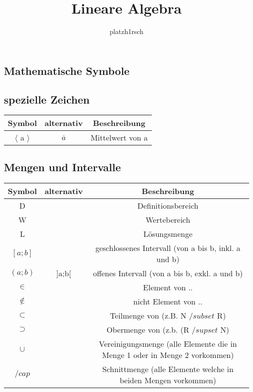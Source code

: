 \documentclass[11pt,a4paper,onecolumn]{scrartcl}
\author{platzh1rsch}
\title{Lineare Algebra}
\begin{document}
\maketitle
\newpage
\begin{flushleft}

\section{Mathematische Symbole}
\subsection{spezielle Zeichen}

\begin{tabular}{|c|c|c|}
\hline 
Symbol & alternativ & Beschreibung \\ 
\hline 
$ \langle $ a $ \rangle $ & $ \overline{a} $ & Mittelwert von a \\ 
\hline 
\end{tabular} 

\subsection{Mengen und Intervalle}

\begin{tabular}{|c|c|c|}
\hline 
Symbol & alternativ & Beschreibung \\ 
\hline 
D  &  & Definitionsbereich \\ 
W  &  & Wertebereich \\ 
L  &  & Lösungsmenge \\ 
\hline
$ [a;b] $ &  & geschlossenes Intervall (von a bis b, inkl. a und b)\\ 
$(a;b)$  & ]a;b[ & offenes Intervall (von a bis b, exkl. a und b) \\ 
\hline
$ \in $ &  & Element von .. \\  
$ \notin $ &  & nicht Element von .. \\  
$ \subset $ & & Teilmenge von (z.B. N $ /subset $ R) \\
$ \supset $ & & Obermenge von (z.b. (R $ /supset $ N)\\
$\cup$& & Vereinigungsmenge (alle Elemente die in Menge 1 oder in Menge 2 vorkommen)\\
$ /cap $ & & Schnittmenge (alle Elemente welche in beiden Mengen vorkommen)\\
\hline
\end{tabular}


\end{flushleft}
\end{document}
